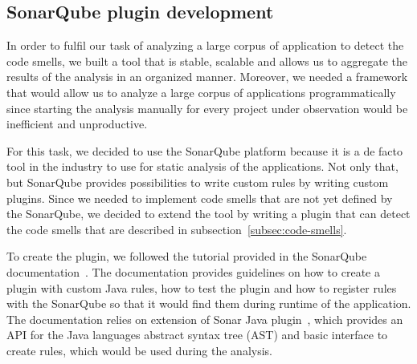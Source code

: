 
\subsection{SonarQube plugin development}\label{subsec:sonarqube-plugin-development}

In order to fulfil our task of analyzing a large corpus of application to detect the code smells,
we built a tool that is stable, scalable and allows us to aggregate the results of the
analysis in an organized manner.
Moreover, we needed a framework that would allow us to analyze a large corpus of applications programmatically since starting
the analysis manually for every project under observation would be inefficient and unproductive.

For this task, we decided to use the SonarQube platform because it is a de facto tool in the industry to use
for static analysis of the applications.
Not only that, but SonarQube provides possibilities to write custom rules by writing custom plugins.
Since we needed to implement code smells that are not yet defined by the SonarQube, we decided to extend
the tool by writing a plugin that can detect the code smells that are described in subsection~\ref{subsec:code-smells}.


To create the plugin, we followed the tutorial provided in the SonarQube documentation~\cite{sonar_plugin_tutorial}.
The documentation provides guidelines on how to create a plugin with custom Java rules, how to test the plugin and
how to register rules with the SonarQube so that it would find them during runtime of the application.
The documentation relies on extension of Sonar Java plugin~\cite{sonar_java_plugin}, which provides an API
for the Java languages abstract syntax tree (AST) and basic interface to create rules, which would be used
during the analysis.

